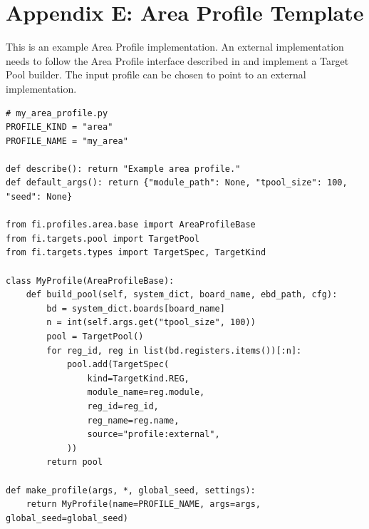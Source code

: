 \chapter{Appendix E: Area Profile Template}
\label{app_e:area_prof}

This is an example Area Profile implementation. An external implementation needs to follow the Area Profile interface described in  and implement a Target Pool builder. The input profile can be chosen to point to an external implementation.


\begin{lstlisting}[caption={Minimal template for an external area profile compatible with \texttt{--area input}.},label={lst:fi_area_external_template}]
# my_area_profile.py
PROFILE_KIND = "area"
PROFILE_NAME = "my_area"

def describe(): return "Example area profile."
def default_args(): return {"module_path": None, "tpool_size": 100, "seed": None}

from fi.profiles.area.base import AreaProfileBase
from fi.targets.pool import TargetPool
from fi.targets.types import TargetSpec, TargetKind

class MyProfile(AreaProfileBase):
    def build_pool(self, system_dict, board_name, ebd_path, cfg):
        bd = system_dict.boards[board_name]
        n = int(self.args.get("tpool_size", 100))
        pool = TargetPool()
        for reg_id, reg in list(bd.registers.items())[:n]:
            pool.add(TargetSpec(
                kind=TargetKind.REG,
                module_name=reg.module,
                reg_id=reg_id,
                reg_name=reg.name,
                source="profile:external",
            ))
        return pool

def make_profile(args, *, global_seed, settings):
    return MyProfile(name=PROFILE_NAME, args=args, global_seed=global_seed)
\end{lstlisting}
